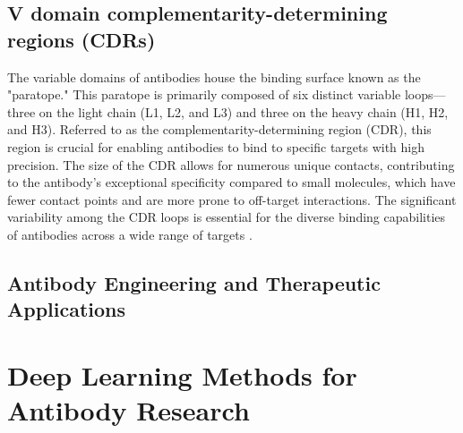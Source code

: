 \subsection{V domain complementarity-determining regions (CDRs)}

The variable domains of antibodies house the binding surface known as the "paratope." This paratope is primarily composed of six distinct variable loops—three on the light chain (L1, L2, and L3) and three on the heavy chain (H1, H2, and H3). Referred to as the complementarity-determining region (CDR), this region is crucial for enabling antibodies to bind to specific targets with high precision. The size of the CDR allows for numerous unique contacts, contributing to the antibody's exceptional specificity compared to small molecules, which have fewer contact points and are more prone to off-target interactions. The significant variability among the CDR loops is essential for the diverse binding capabilities of antibodies across a wide range of targets \citep{Graves2020}.


\subsection{Antibody Engineering and Therapeutic Applications}


\section{Deep Learning Methods for Antibody Research}

